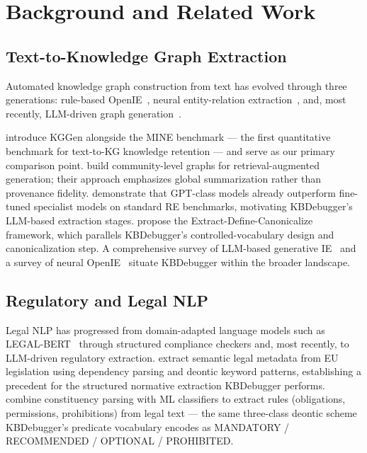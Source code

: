 \section{Background and Related Work}

\subsection{Text-to-Knowledge Graph Extraction}

Automated knowledge graph construction from text has evolved through three generations:
rule-based OpenIE~\citep{banko2007open,niklaus2018survey}, neural entity-relation extraction~\citep{huguetcabot2021rebel,ye2022plmarker,tang2022unirel}, and, most recently, LLM-driven graph
generation~\citep{zhu2024llmkg,pan2024unifying,zhang2024edc,xu2024llmie}.

\citet{mo2025kggen} introduce KGGen alongside the MINE benchmark — the first quantitative
benchmark for text-to-KG knowledge retention — and serve as our primary comparison point.
\citet{edge2024graphrag} build community-level graphs for retrieval-augmented generation;
their approach emphasizes global summarization rather than provenance fidelity.
\citet{wadhwa2023re} demonstrate that GPT-class models already outperform fine-tuned
specialist models on standard RE benchmarks, motivating KBDebugger's LLM-based
extraction stages. \citet{zhang2024edc} propose the Extract-Define-Canonicalize framework,
which parallels KBDebugger's controlled-vocabulary design and canonicalization step.
A comprehensive survey of LLM-based generative IE~\citep{xu2024llmie} and a survey of
neural OpenIE~\citep{zhong2022openiesurvey} situate KBDebugger within the broader landscape.

\subsection{Regulatory and Legal NLP}

Legal NLP has progressed from domain-adapted language models such as
LEGAL-BERT~\citep{chalkidis2020legalbert} through structured compliance checkers and,
most recently, to LLM-driven regulatory extraction.
\citet{sleimi2018semantic} extract semantic legal metadata from EU legislation using
dependency parsing and deontic keyword patterns, establishing a precedent for the
structured normative extraction KBDebugger performs.
\citet{dragoni2019combining} combine constituency parsing with ML classifiers to extract
rules (obligations, permissions, prohibitions) from legal text — the same three-class
deontic scheme KBDebugger's predicate vocabulary encodes as MANDATORY / RECOMMENDED /
OPTIONAL / PROHIBITED.

